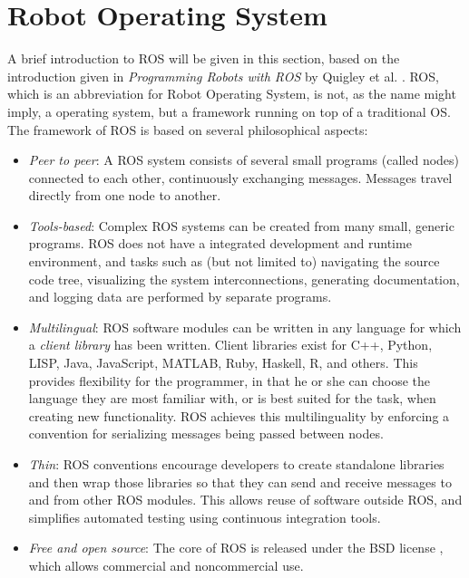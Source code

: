 \section{Robot Operating System}
A brief introduction to ROS will be given in this section, based on the introduction given in \textit{Programming Robots with ROS} by Quigley et al. \cite{programming_ros}. ROS, which is an abbreviation for Robot Operating System, is not, as the name might imply, a operating system, but a framework running on top of a traditional OS. The framework of ROS is based on several philosophical aspects:
\begin{itemize}
	\item \textit{Peer to peer}: A ROS system consists of several small programs (called nodes) connected to each other, continuously exchanging messages. Messages travel directly from one node to another.
	\item \textit{Tools-based}: Complex ROS systems can be created from many small, generic programs. ROS does not have a integrated development and runtime environment, and tasks such as (but not limited to) navigating the source code tree, visualizing the system interconnections, generating documentation, and logging data are performed by separate programs.
	\item \textit{Multilingual}: ROS software modules can be written in any language for which a \textit{client library} has been written. Client libraries exist for C++, Python, LISP, Java, JavaScript, MATLAB, Ruby, Haskell, R, and others. This provides flexibility for the programmer, in that he or she can choose the language they are most familiar with, or is best suited for the task, when creating new functionality. ROS achieves this multilinguality by enforcing a convention for serializing messages being passed between nodes.
	\item \textit{Thin}: ROS conventions encourage developers to create standalone libraries and then wrap those libraries so that they can send and receive messages to and from other ROS modules. This allows reuse of software outside ROS, and simplifies automated testing using continuous integration tools.
	\item \textit{Free and open source}: The core of ROS is released under the BSD license \cite{BSD}, which allows commercial and noncommercial use.
\end{itemize}
